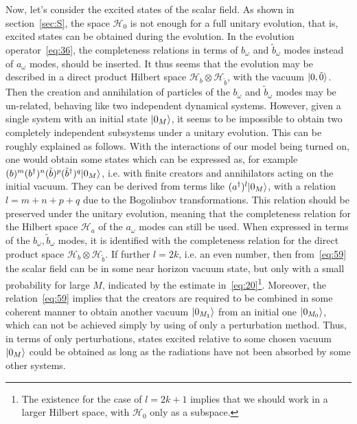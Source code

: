 \documentclass[12pt,a4paper]{article}
\begin{document}
Now, let's consider the excited states of the scalar field. As shown in section~\ref{sec:S}, the space $\mathcal {H}_0$ is not enough for a full unitary evolution, that is, excited states can be obtained during the evolution. In the evolution operator~\eqref{eq:36}, the completeness relations in terms of $b_{\omega}$ and $\tilde{b}_{\omega}$ modes instead of $a_{\omega}$ modes, should be inserted. It thus seems that the evolution may be described in a direct product Hilbert space
$\mathcal {H}_b\otimes \mathcal {H}_{\tilde{b}}$, with the vacuum $\arrowvert0,\tilde{0}\rangle$. Then the creation and
annihilation of particles of the $b_{\omega}$ and $\tilde{b}_{\omega}$ modes
may be un-related, behaving like two independent dynamical
systems. However, given a single system with an initial state $\arrowvert0_M\rangle$, it seems to be impossible to
obtain two completely independent subsystems under a unitary evolution. This can be roughly explained as follows. With the interactions of our model being turned on, one would obtain some states which can be expressed as, for example $(b)^m(b^{\dag})^n(\tilde{b})^p(\tilde{b}^{\dag})^q\arrowvert0_M\rangle$, i.e. with finite creators and annihilators acting on the initial vacuum. They can be derived from terms like $(a^{\dag})^l\arrowvert0_M\rangle$, with a relation $l=m+n+p+q$ due to the Bogoliubov transformations. This relation should be preserved under the unitary evolution, meaning that the completeness relation for the Hilbert space $\mathcal {H}_a$ of the $a_{\omega}$ modes can still be used. When expressed in terms of the $b_{\omega},\tilde{b}_{\omega}$ modes, it is identified with the completeness relation for the direct product space $\mathcal {H}_b\otimes \mathcal {H}_{\tilde{b}}$. If further $l=2k$, i.e. an even number, then from~\eqref{eq:59} the scalar field can be in some near horizon vacuum state, but only with a small probability for large $M$, indicated by the estimate in~\eqref{eq:20}\footnote{The existence for the case of $l=2k+1$ implies that we should work in a larger Hilbert space, with $\mathcal {H}_0$ only as a subspace.}. Moreover, the relation~\eqref{eq:59} implies that the creators are required to be combined in some coherent manner to obtain another vacuum $\arrowvert0_{M_1}\rangle$ from an initial one $\arrowvert0_{M_0}\rangle$, which can not be achieved simply by using of only a perturbation method. Thus, in terms of only perturbations, states excited relative to some chosen vacuum $\arrowvert0_{M}\rangle$ could be obtained as long as the radiations have not been absorbed by some other systems.
\end{document}
